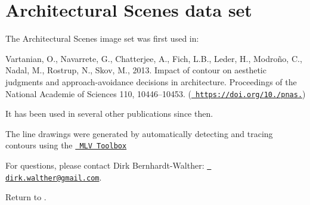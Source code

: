 \chapter{Architectural Scenes data set}
\hypertarget{md_data_sets_2_architectural_scenes_2_architectural_scenes___readme}{}\label{md_data_sets_2_architectural_scenes_2_architectural_scenes___readme}
\label{md_data_sets_2_architectural_scenes_2_architectural_scenes___readme_autotoc_md0}%
%
 The Architectural Scenes image set was first used in\+:

Vartanian, O., Navarrete, G., Chatterjee, A., Fich, L.\+B., Leder, H., Modroño, C., Nadal, M., Rostrup, N., Skov, M., 2013. Impact of contour on aesthetic judgments and approach-\/avoidance decisions in architecture. Proceedings of the National Academie of Sciences 110, 10446–10453. (\href{https://doi.org/10.1073/pnas.1301227110}{\texttt{ https\+://doi.\+org/10./pnas.}})

It has been used in several other publications since then.

The line drawings were generated by automatically detecting and tracing contours using the \href{http://mlvtoolbox.org}{\texttt{ MLV Toolbox}}

For questions, please contact Dirk Bernhardt-\/\+Walther\+: \href{mailto:dirk.walther@gmail.com}{\texttt{ dirk.\+walther@gmail.\+com}}.

Return to . 